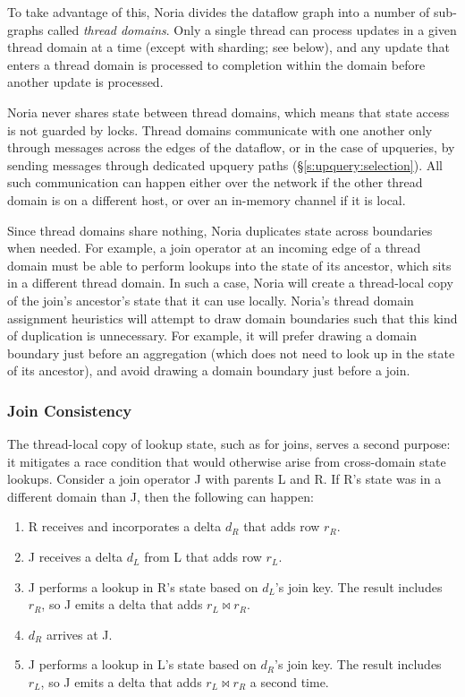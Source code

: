 To take advantage of this, Noria divides the dataflow graph into a number of
sub-graphs called \textit{thread domains}. Only a single thread can process
updates in a given thread domain at a time (except with sharding; see below),
and any update that enters a thread domain is processed to completion within
the domain before another update is processed.

Noria never shares state between thread domains, which means that state access
is not guarded by locks. Thread domains communicate with one another only
through messages across the edges of the dataflow, or in the case of upqueries,
by sending messages through dedicated upquery paths
(\S\ref{s:upquery:selection}). All such communication can happen either over the
network if the other thread domain is on a different host, or over an in-memory
channel if it is local.

Since thread domains share nothing, Noria duplicates state across boundaries
when needed. For example, a join operator at an incoming edge of a thread domain
must be able to perform lookups into the state of its ancestor, which sits in a
different thread domain. In such a case, Noria will create a thread-local copy
of the join's ancestor's state that it can use locally. Noria's thread domain
assignment heuristics will attempt to draw domain boundaries  such that this
kind of duplication is unnecessary. For example, it will prefer drawing a domain
boundary just before an aggregation (which does not need to look up in the state
of its ancestor), and avoid drawing a domain boundary just before a join.

\subsubsection{Join Consistency}
\label{s:join-state-dupe}

The thread-local copy of lookup state, such as for joins, serves a second
purpose: it mitigates a race condition that would otherwise arise from
cross-domain state lookups. Consider a join operator J with parents L and R. If
R's state was in a different domain than J, then the following can happen:

\begin{enumerate}
  \item R receives and incorporates a delta $d_R$ that adds row $r_R$.
  \item J receives a delta $d_L$ from L that adds row $r_L$.
  \item J performs a lookup in R's state based on $d_L$'s join key. The result
    includes $r_R$, so J emits a delta that adds $r_L \bowtie r_R$.
  \item $d_R$ arrives at J.
  \item J performs a lookup in L's state based on $d_R$'s join key. The result
    includes $r_L$, so J emits a delta that adds $r_L \bowtie r_R$ a second
    time.
\end{enumerate}

